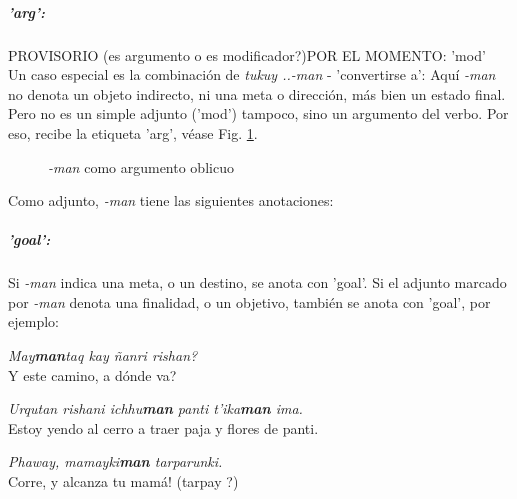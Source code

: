 \documentclass[a4paper,11pt,DIV12]{scrartcl}
\begin{document}
\subparagraph{'arg':}
PROVISORIO (es argumento o es modificador?)POR EL MOMENTO: 'mod'\\
Un caso especial es la combinaci\'on de {\em tukuy ..-man} - 'convertirse a': Aqu\'i {\em -man} no denota un objeto indirecto, ni una meta o direcci\'on, m\'as bien un estado final. Pero no es un simple adjunto ('mod') tampoco, sino un argumento del verbo. Por eso, recibe la etiqueta 'arg', v\'ease Fig. \ref{Fig:manarg}. \\

\begin{figure}
 \begin{center}
\end{center}
\caption{{\em -man} como argumento oblicuo}\label{Fig:manarg}
\end{figure}

\vspace{0.2cm}
Como adjunto, {\em -man} tiene las siguientes anotaciones:\\

\subparagraph{'goal':}
Si {\em -man} indica una meta, o un destino, se anota con 'goal'. Si el adjunto marcado por {\em -man} denota una finalidad, o un objetivo, tambi\'en se anota con 'goal', por ejemplo:


\begin{examples}
 \item {\em May\textbf{man}taq kay \~nanri rishan?}\\
      {\textquestiondown}Y este camino, a d\'onde va?
 \item {\em Urqutan rishani ichhu\textbf{man} panti t'ika\textbf{man} ima.}\\
       Estoy yendo al cerro a traer paja y flores de panti.
 \item\label{Ex:mangoal} {\em Phaway, mamayki\textbf{man} tarparunki.}\\
	{\textexclamdown}Corre, y alcanza tu mam\'a! (tarpay ?)\\
 \hfill {\small \citep[123-124]{Cusi2}}
\end{examples}
\end{document}
